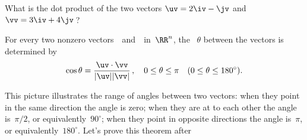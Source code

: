 \begin{activity}
What is the dot product of the two vectors \(\uv=2\iv-\jv\) and \(\vv=3\iv+4\jv\)\,?
\end{activity}





\begin{theorem} \label{thm:anglev}
For every two nonzero vectors~\uv\ and~\vv\ in~\(\RR^n\),  
the ~\(\theta\) between the vectors is determined by 
\begin{equation*}
\cos\theta=\frac{\uv\cdot\vv}{|\uv||\vv|}\,,
\quad 0\leq\theta\leq\pi
\quad (0\leq\theta\leq180^\circ).
\end{equation*}
\end{theorem}

\begin{wrapfigure}{r}{0pt} 
\end{wrapfigure}
This picture illustrates the range of angles between two vectors: when they point in the same direction the angle is zero; when they are at  to each other the angle is~\(\pi/2\), or equivalently~\(90^\circ\); when they point in opposite directions the angle is~\(\pi\), or equivalently~\(180^\circ\).
Let's prove this theorem after 



